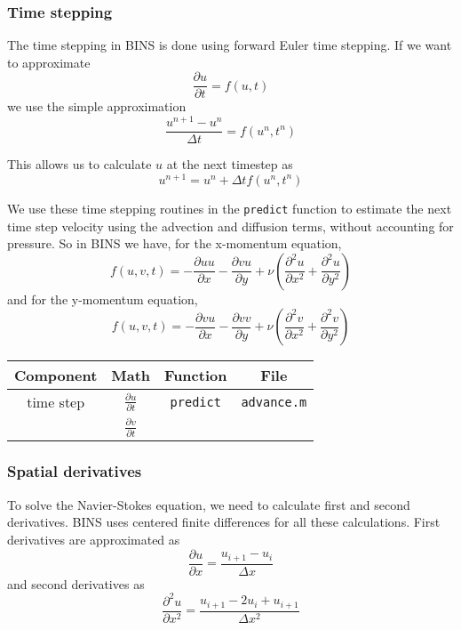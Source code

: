 \documentclass[12pt]{article}
\begin{document}
\subsubsection{Time stepping}
The time stepping in BINS is done using forward Euler time stepping.  If we want to approximate 
\[ \frac{\partial u}{\partial t} = f(u,t) \]
we use the simple approximation
\[ \frac{u^{n+1}-u^n}{\Delta t} = f(u^n,t^n)\]

This allows us to calculate $u$ at the next timestep as
\begin{equation}
u^{n+1} = u^n + \Delta t f(u^n,t^n)
\end{equation}

We use these time stepping routines in the \texttt{predict} function to estimate the next time step velocity using the advection and diffusion terms, without accounting for pressure.  So in BINS we have, for the x-momentum equation,
\[ f(u,v,t) = -\frac{\partial u u}{\partial x}-\frac{\partial v u}{\partial y} + \nu\left( \frac{\partial^2 u}{\partial x^2} + \frac{\partial^2 u}{\partial y^2} \right) \]
and for the y-momentum equation,
\[ f(u,v,t) = -\frac{\partial v u}{\partial x}-\frac{\partial v v}{\partial y} + \nu\left( \frac{\partial^2 v}{\partial x^2} + \frac{\partial^2 v}{\partial y^2} \right) \]

\begin{center}
\begin{tabular}{|c|c|c|c|}
\hline 
\bf{Component} & \bf{Math} & \bf{Function} & \bf{File}\\ 
\hline 
time step & \Large{$\frac{\partial u}{\partial t}$} & \texttt{predict}& \texttt{advance.m} \\ 
 & \Large{$\frac{\partial v}{\partial t}$} &  &   \\ 
\hline 
\end{tabular} 
\end{center}

\subsubsection{Spatial derivatives}
To solve the Navier-Stokes equation, we need to calculate first and second derivatives.  BINS uses centered finite differences for all these calculations.  First derivatives are approximated as
\begin{equation}
\label{firstDeriv}
\frac{\partial u}{\partial x} = \frac{u_{i+1} - u_{i}}{\Delta x}
\end{equation}
and second derivatives as
\begin{equation}
\label{secondDeriv}
\frac{\partial^2 u}{\partial x^2} = \frac{u_{i+1} -2 u_i + u_{i+1}}{\Delta x^2}
\end{equation} 
\end{document}
